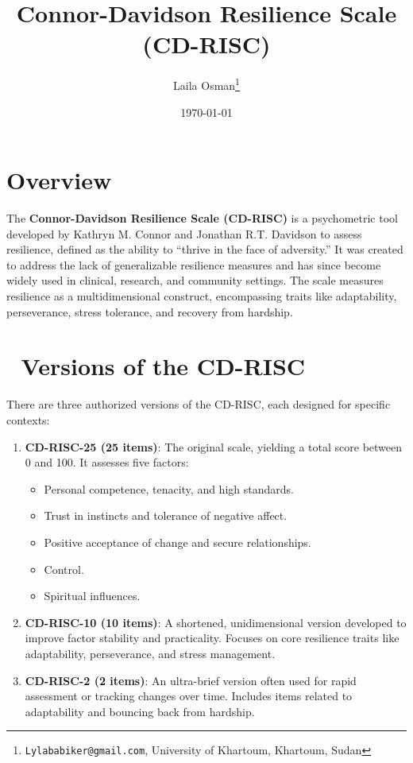 \documentclass[12pt]{article}
\title{\textcolor{titleColor}{\textbf{\Huge \textbf{ Connor-Davidson Resilience Scale (CD-RISC) }}}}
\author{Laila Osman\thanks{\texttt{Lylababiker@gmail.com}, University of Khartoum, Khartoum, Sudan}}
\date{\today}
\begin{document}
\maketitle

\section*{ Overview }

The \textbf{Connor-Davidson Resilience Scale (CD-RISC)} is a psychometric tool developed by Kathryn M. Connor and Jonathan R.T. Davidson to assess resilience, defined as the ability to ``thrive in the face of adversity.'' It was created to address the lack of generalizable resilience measures and has since become widely used in clinical, research, and community settings. The scale measures resilience as a multidimensional construct, encompassing traits like adaptability, perseverance, stress tolerance, and recovery from hardship.

\section*{🔢 Versions of the CD-RISC}

There are three authorized versions of the CD-RISC, each designed for specific contexts:

\begin{enumerate}
    \item \textbf{CD-RISC-25 (25 items)}: The original scale, yielding a total score between 0 and 100. It assesses five factors:
    \begin{itemize}
        \item Personal competence, tenacity, and high standards.
        \item Trust in instincts and tolerance of negative affect.
        \item Positive acceptance of change and secure relationships.
        \item Control.
        \item Spiritual influences.
    \end{itemize}
    
    \item \textbf{CD-RISC-10 (10 items)}: A shortened, unidimensional version developed to improve factor stability and practicality. Focuses on core resilience traits like adaptability, perseverance, and stress management.
    
    \item \textbf{CD-RISC-2 (2 items)}: An ultra-brief version often used for rapid assessment or tracking changes over time. Includes items related to adaptability and bouncing back from hardship.
\end{enumerate}
\end{document}
